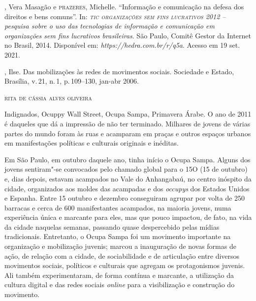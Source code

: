 \begin{bibliohedra}
, Vera Masagão e \textsc{prazeres}, Michelle. ``Informação e comunicação
na defesa dos direitos e bens comuns''. In: \emph{\textsc{tic organizações sem
fins lucrativos} 2012 -- pesquisa sobre o uso das tecnologias de
informação e comunicação em organizações sem fins lucrativos
brasileiras}. São Paulo, Comitê Gestor da Internet no Brasil, 2014.
Disponível em:
\emph{https://hedra.com.br/r/q5a}.
Acesso em 19 set. 2021.

, Ilse. Das mobilizações às redes de movimentos sociais.
Sociedade e Estado, Brasília, v.\,21, n.\,1, p.\,109--130, jan-abr 2006.
\end{bibliohedra}


\begin{flushright}
\textsc{rita de cássia alves oliveira}
\end{flushright}

\noindent{}Indignados, Ocuppy Wall Street, Ocupa Sampa, Primavera Árabe. O ano de
2011 é daqueles que dá a impressão de não ter terminado. Milhares de
jovens de várias partes do mundo foram às ruas e acamparam em praças e
outros espaços urbanos em manifestações políticas e culturais originais
e inéditas.

Em São Paulo, em outubro daquele ano, tinha início o Ocupa Sampa. Alguns
dos jovens sentiram"-se convocados pelo chamado global para o 15O (15 de
outubro) e, dias depois, estavam acampados no Vale do Anhangabaú, no
centro inóspito da cidade, organizados aos moldes das acampadas e dos
\emph{occupys} dos Estados Unidos e Espanha. Entre 15 outubro e dezembro
conseguiram agrupar por volta de 250 barracas e cerca de 600
manifestantes acampados, na maioria jovens, numa experiência única e
marcante para eles, mas que pouco impactou, de fato, na vida da cidade
naquelas semanas, passando quase despercebido pelas mídias tradicionais.
Entretanto, o Ocupa Sampa foi um movimento importante na organização e
mobilização juvenis; marcou a inauguração de novas formas de ação, de
relação com a cidade, de sociabilidade e de articulação entre diversos
movimentos sociais, políticos e culturais que agregam os protagonismos
juvenis. Ali também experimentaram, de forma contínua e marcante, a
utilização da cultura digital e das redes sociais \emph{online} para a
visibilização e construção do movimento.

